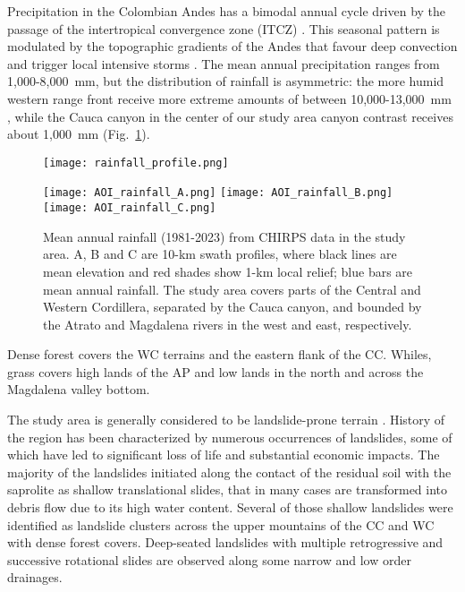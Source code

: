 \documentclass[draft]{agujournal2019}
\begin{document}
\par Precipitation in the Colombian Andes has a bimodal annual cycle driven by the passage of the intertropical convergence zone (ITCZ) \cite{bedoya2019}. This seasonal pattern is modulated by the topographic gradients of the Andes that favour deep convection and trigger local intensive storms \cite{Poveda2011}. The mean annual precipitation ranges from 1,000-8,000~mm, but the distribution of rainfall is asymmetric: the more humid western range front receive more extreme amounts of between 10,000-13,000~mm \cite{poveda2000existence}, while the Cauca canyon in the center of our study area canyon contrast receives about 1,000~mm (Fig.~\ref{fig:rainfall}). 

\begin{figure}[ht!]
   \begin{minipage}{.48\linewidth}
    \centering
      {\texttt{[image: rainfall\_profile.png]}}
  \end{minipage}
  \begin{minipage}{.48\linewidth}
    \centering
      {\texttt{[image: AOI\_rainfall\_A.png]}}
     {\texttt{[image: AOI\_rainfall\_B.png]}}
     {\texttt{[image: AOI\_rainfall\_C.png]}}
   \end{minipage}\quad
    \caption{Mean annual rainfall (1981-2023) from CHIRPS data \cite{funk2015} in the study area. A, B and C are 10-km swath profiles, where black lines are mean elevation and red shades show 1-km local relief; blue bars are mean annual rainfall. The study area covers parts of the Central and Western Cordillera, separated by the Cauca canyon, and bounded by the Atrato and Magdalena rivers in the west and east, respectively.}
    \label{fig:rainfall}
\end{figure}

\par Dense forest covers the WC terrains and the eastern flank of the CC. Whiles, grass covers high lands of the AP and low lands in the north and across the Magdalena valley bottom.

\par The study area is generally considered to be landslide-prone terrain \cite{aristizabal2020spatial, gomez2023spatial}. History of the region has been characterized by numerous occurrences of landslides, some of which have led to significant loss of life and substantial economic impacts. The majority of the landslides initiated along the contact of the residual soil with the saprolite as shallow translational slides, that in many cases are transformed into debris flow due to its high water content. Several of those shallow landslides were identified as landslide clusters across the upper mountains of the CC and WC with dense forest covers. Deep-seated landslides with multiple retrogressive and successive rotational slides are observed along some narrow and low order drainages.
\end{document}
